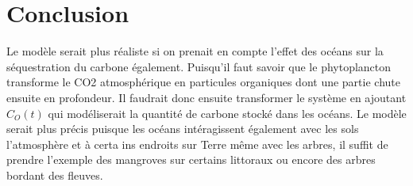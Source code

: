\documentclass[12pt]{article}
\theoremstyle{saav}
\begin{document}
	\section{Conclusion}
	
	
	Le modèle serait plus réaliste si on prenait en compte l'effet des océans sur la séquestration du carbone également. Puisqu'il faut savoir que le phytoplancton transforme le CO2 atmosphérique en particules organiques dont une partie chute ensuite en profondeur. Il faudrait donc ensuite transformer le système en ajoutant $C_{O}(t)$ qui modéliserait la quantité de carbone stocké dans les océans. Le modèle serait plus précis puisque les océans intéragissent également avec les sols l'atmosphère et à certa ins endroits sur Terre même avec les arbres, il suffit de prendre l'exemple des mangroves sur certains littoraux ou encore des arbres bordant des fleuves.
	
	
	
\end{document}
